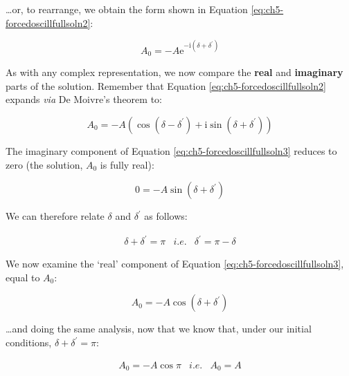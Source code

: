 \documentclass[
]{book}
\begin{document}
\ldots or, to rearrange, we obtain the form shown in Equation \eqref{eq:ch5-forcedoscillfullsoln2}:

\begin{equation}
A_0 = -A \mathrm{e}^{-\mathrm{i}\left( \delta + \delta^\prime \right)}
\label{eq:ch5-forcedoscillfullsoln2}
\end{equation}

As with any complex representation, we now compare the \textbf{real} and \textbf{imaginary} parts of the solution. Remember that Equation \eqref{eq:ch5-forcedoscillfullsoln2} expands \emph{via} De Moivre's theorem to:

\begin{equation}
A_0 = -A \left( \cos \left( \delta - \delta^\prime \right) + \mathrm{i} \sin \left( \delta + \delta^\prime \right)  \right)
\label{eq:ch5-forcedoscillfullsoln3}
\end{equation}

The imaginary component of Equation \eqref{eq:ch5-forcedoscillfullsoln3} reduces to zero (the solution, \(A_0\) is fully real):

\begin{equation}
0 = -A \sin \left( \delta + \delta^\prime \right)
\end{equation}

We can therefore relate \(\delta\) and \(\delta^\prime\) as follows:

\begin{equation}
\begin{array}{rcl}
\delta + \delta^\prime = \pi & \textit{i.e.} & \delta^\prime = \pi - \delta
\end{array}
\label{eq:ch5-forcedoscillationfullsoln4}
\end{equation}

We now examine the `real' component of Equation \eqref{eq:ch5-forcedoscillfullsoln3}, equal to \(A_0\):

\begin{equation}
A_0 = - A \cos \left( \delta + \delta^\prime \right)
\end{equation}

\ldots and doing the same analysis, now that we know that, under our initial conditions, \(\delta + \delta^\prime = \pi\):

\begin{equation}
\begin{array}{rcl}
A_0 = -A \cos \pi & \textit{i.e.} & A_0 = A
\end{array}
\label{eq:ch5-forcedoscillationfullsoln5}
\end{equation}
\end{document}
